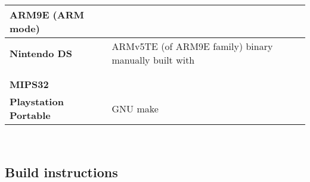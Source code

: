 \begin{tabular}{l l}
{\bf{\large ARM9E (ARM mode)}} &                             \\
\hline\hline
{\bf Nintendo DS} & ARMv5TE (of ARM9E family) binary manually built with \cite{devkitPro}\\
\hline
                  &                                           \\
                  &                                           \\
		  
{\bf{\large MIPS32}} &              \\
\hline\hline
{\bf Playstation Portable} & GNU make                        \\
\hline

\end{tabular}\\

\pagebreak

\subsection{Build instructions}



